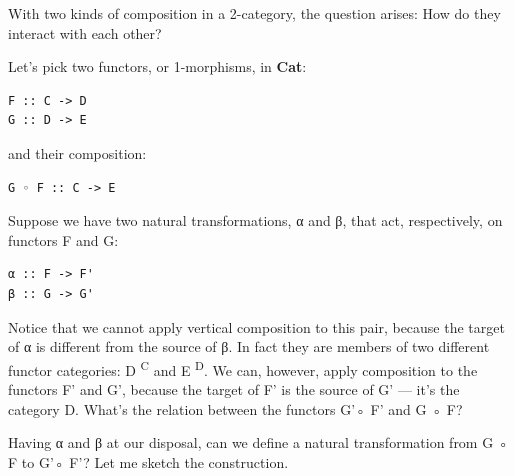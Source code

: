 \noindent
With two kinds of composition in a 2-category, the question arises: How
do they interact with each other?

Let's pick two functors, or 1-morphisms, in \textbf{Cat}:

\begin{verbatim}
F :: C -> D
G :: D -> E
\end{verbatim}
and their composition:

\begin{verbatim}
G ◦ F :: C -> E
\end{verbatim}
Suppose we have two natural transformations, α and β, that act,
respectively, on functors F and G:

\begin{verbatim}
α :: F -> F'
β :: G -> G'
\end{verbatim}

\begin{figure}[H]
\centering
{}
\end{figure}

\noindent
Notice that we cannot apply vertical composition to this pair, because
the target of α is different from the source of β. In fact they are
members of two different functor categories: D \textsuperscript{C} and E
\textsuperscript{D}. We can, however, apply composition to the functors
F' and G', because the target of F' is the source of G' --- it's the
category D. What's the relation between the functors G'◦ F' and G ◦ F?

Having α and β at our disposal, can we define a natural transformation
from G ◦ F to G'◦ F'? Let me sketch the construction.

\begin{figure}[H]
\centering
{}
\end{figure}

